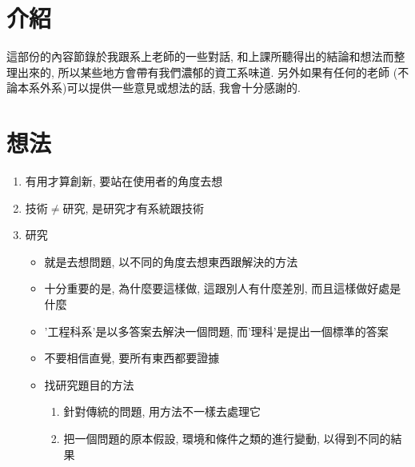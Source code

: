 
\section{介紹}

這部份的內容節錄於我跟系上老師的一些對話, 和上課所聽得出的結論和想法而整理出來的, 所以某些地方會帶有我們濃郁的資工系味道. 另外如果有任何的老師 (不論本系外系)可以提供一些意見或想法的話, 我會十分感謝的.

\section{想法}

\begin{enumerate}
  \item
  {
    有用才算創新, 要站在使用者的角度去想
  } %

  \item
  {
    技術$\neq$研究, 是研究才有系統跟技術
  } %

  \item
  {
    研究
    \begin{itemize}
      \item
      {
        就是去想問題, 以不同的角度去想東西跟解決的方法
      } %

      \item
      {
        十分重要的是, 為什麼要這樣做, 這跟別人有什麼差別, 而且這樣做好處是什麼
      } %

      \item
      {
        '工程科系'是以多答案去解決一個問題, 而'理科'是提出一個標準的答案
      } %

      \item
      {
        不要相信直覺, 要所有東西都要證據
      } %

      \item
      {
        找研究題目的方法
      } %

      \begin{enumerate}
        \item
        {
          針對傳統的問題, 用方法不一樣去處理它
        } %

        \item
        {
          把一個問題的原本假設, 環境和條件之類的進行變動, 以得到不同的結果
        } %
      \end{enumerate}
    \end{itemize}
  } %
\end{enumerate}

